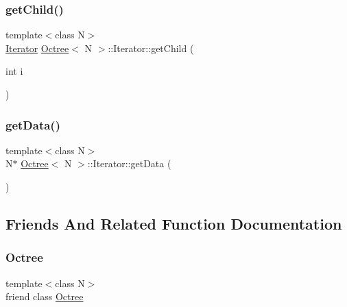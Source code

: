 \subsubsection{\texorpdfstring{get\+Child()}{getChild()}}
{\footnotesize\ttfamily template$<$class N$>$ \\
\hyperlink{classOctree_1_1Iterator}{Iterator} \hyperlink{classOctree}{Octree}$<$ N $>$\+::Iterator\+::get\+Child (\begin{DoxyParamCaption}\item[{int}]{i }\end{DoxyParamCaption})\hspace{0.3cm}{\ttfamily [inline]}}

\mbox{\label{classOctree_1_1Iterator_a507990201d4c1923cd137b2e1e75f1a9}} 
\subsubsection{\texorpdfstring{get\+Data()}{getData()}}
{\footnotesize\ttfamily template$<$class N$>$ \\
N$\ast$ \hyperlink{classOctree}{Octree}$<$ N $>$\+::Iterator\+::get\+Data (\begin{DoxyParamCaption}{ }\end{DoxyParamCaption})\hspace{0.3cm}{\ttfamily [inline]}}



\subsection{Friends And Related Function Documentation}
\mbox{\label{classOctree_1_1Iterator_acc8a7ec8cf44f290482ad3d68f6a7719}} 
\subsubsection{\texorpdfstring{Octree}{Octree}}
{\footnotesize\ttfamily template$<$class N$>$ \\
friend class \hyperlink{classOctree}{Octree}\hspace{0.3cm}{\ttfamily [friend]}}



